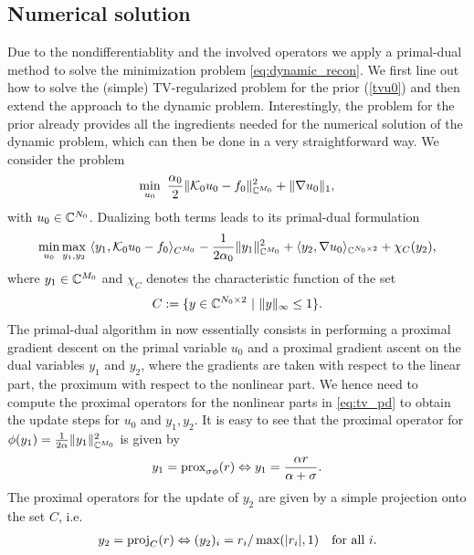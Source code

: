 \subsection{Numerical solution}
%
Due to the nondifferentiablity and the involved operators we apply a primal-dual method \cite{ChambollePock} to solve the minimization problem \eqref{eq:dynamic_recon}. 
We first line out how to solve the (simple) TV-regularized problem for the prior (\ref{tvu0}) and then extend the approach to the dynamic problem. 
Interestingly, the problem for the prior already provides all the ingredients needed for the numerical solution of the dynamic problem, which can then be done in a very straightforward way. 
We consider the problem 
\begin{equation} \label{tvu0}
	\min_{u_0} ~ \frac{\alpha_0}{2} \| \mathcal{K}_0 u_0 - f_0 \|_{\mathbb{C}^{M_0}}^2 + \| \nabla u_0 \|_1, 
\end{equation}
with $u_0 \in \mathbb{C}^{N_0}$.
Dualizing both terms leads to its primal-dual formulation 
\begin{align}\label{eq:tv_pd}
	\min_{u_0} \max_{y_1,y_2} ~ \langle y_1, \mathcal{K}_0 u_0 - f_0 \rangle_{C^{M_0}} - \frac{1}{2 \alpha_0} \|y_1 \|_{\mathbb{C}^{M_0}}^2 + \langle y_2, \nabla u_0 \rangle_{\mathbb{C}^{N_0 \times 2}} + \chi_{C}(y_2),
\end{align}
where $y_1 \in \mathbb{C}^{M_0}$ and $\chi_{C}$ denotes the characteristic function of the set  
\begin{align*}
	C := \{ y \in \mathbb{C}^{N_0 \times 2} ~|~ \|y \|_\infty \leq 1 \}.
\end{align*}
% 
The primal-dual algorithm in \cite{ChambollePock} now essentially consists in performing a proximal gradient descent on the primal variable $u_0$ and a proximal gradient ascent on the dual variables $y_1$ and $y_2$, where the gradients are taken with respect to the linear part, the proximum with respect to the nonlinear part. 
We hence need to compute the proximal operators for the nonlinear parts in \eqref{eq:tv_pd} to obtain the update steps for $u_0$ and $y_1,y_2$. 
It is easy to see that the proximal operator for $\phi(y_1) = \frac{1}{2 \alpha} \|y_1\|_{\mathbb{C}^{M_0}}^2$ is given by 
\begin{align}\label{eq:prox_dual_l2}
	y_1 = \mathrm{prox}_{\sigma \phi} (r) \Leftrightarrow y_1 = \frac{\alpha r}{\alpha + \sigma}.
\end{align}
The proximal operators for the update of $y_2$ are given by a simple projection onto the set $C$, i.e. 
\begin{align}\label{eq:prox_proj}
	y_2 = \mathrm{proj}_C (r) \Leftrightarrow (y_2)_i = r_i / \max (|r_i|,1) \quad \text{for all } i.
\end{align}
